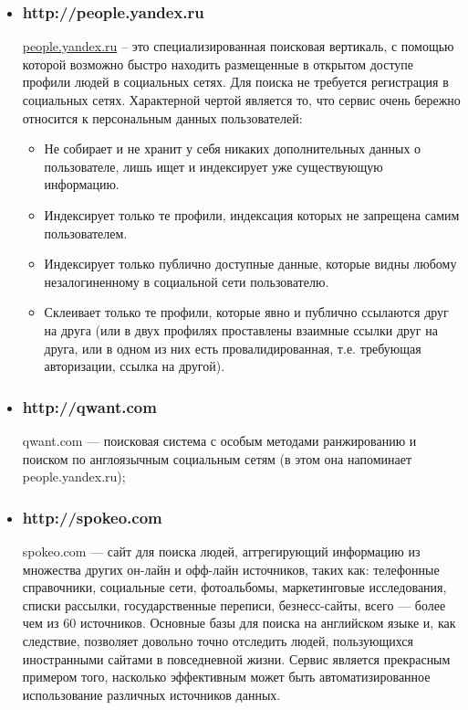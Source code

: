 \begin{chap1}
\begin{itemize}
\item \subsubsection{http://people.yandex.ru} %
\url{people.yandex.ru} – это специализированная поисковая вертикаль, с помощью которой возможно быстро находить размещенные в открытом доступе профили людей в социальных сетях. Для поиска не требуется регистрация в социальных сетях. Характерной чертой является то, что сервис очень бережно относится к персональным данных пользователей:
\begin{itemize}
\item Не собирает и не хранит у себя никаких дополнительных данных о пользователе, лишь ищет и индексирует уже существующую информацию.
\item Индексирует только те профили, индексация которых не запрещена самим пользователем.
\item Индексирует только публично доступные данные, которые видны любому незалогиненному в социальной сети пользователю.
\item Склеивает только те профили, которые явно и публично ссылаются друг на друга (или в двух профилях проставлены взаимные ссылки друг на друга, или в одном из них есть провалидированная, т.е. требующая авторизации, ссылка на другой).
\end{itemize}
\item \subsubsection{http://qwant.com}
qwant.com — поисковая система с особым методами ранжированию и поиском по англоязычным социальным сетям (в этом она напоминает people.yandex.ru);
\item \subsubsection{http://spokeo.com}
spokeo.com — сайт для поиска людей, аггрегирующий информацию из множества других он-лайн и офф-лайн источников, таких как: телефонные справочники, социальные сети, фотоальбомы, маркетинговые исследования, списки рассылки, государственные переписи, безнесс-сайты, всего — более чем из 60 источников. Основные базы для поиска на английском языке и, как следствие, позволяет довольно точно отследить людей, пользующихся иностранными сайтами в повседневной жизни. Сервис является прекрасным примером того, насколько эффективным может быть автоматизированное использование различных источников данных.
\end{itemize}


\end{chap1}
